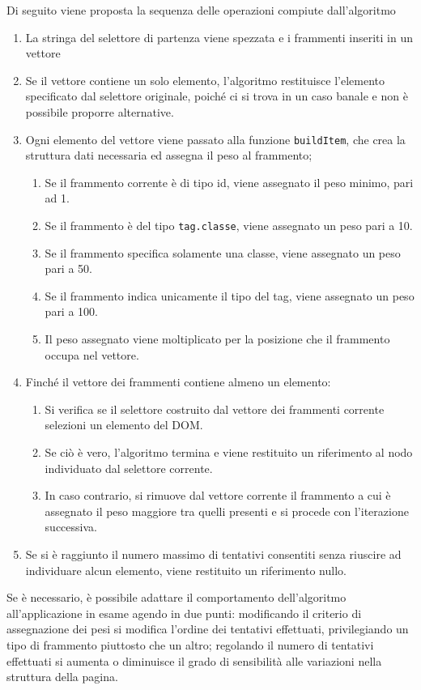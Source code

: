 Di seguito viene proposta la sequenza delle operazioni compiute dall'algoritmo

\begin{enumerate}
\item La stringa del selettore di partenza viene spezzata e i frammenti inseriti in un vettore
\item Se il vettore contiene un solo elemento, l'algoritmo restituisce l'elemento specificato dal selettore originale, poiché ci si trova in un caso banale e non è possibile proporre alternative.
\item Ogni elemento del vettore viene passato alla funzione \verb|buildItem|, che crea la struttura dati necessaria ed assegna il peso al frammento;
	\begin{enumerate}
		\item Se il frammento corrente è di tipo id, viene assegnato il peso minimo, pari ad 1.
		\item Se il frammento è del tipo \verb|tag.classe|, viene assegnato un peso pari a 10.
		\item Se il frammento specifica solamente una classe, viene assegnato un peso pari a 50.
		\item Se il frammento indica unicamente il tipo del tag, viene assegnato un peso pari a 100.
		\item Il peso assegnato viene moltiplicato per la posizione che il frammento occupa nel vettore.
	\end{enumerate}
\item Finché il vettore dei frammenti contiene almeno un elemento:
	\begin{enumerate}
		\item Si verifica se il selettore costruito dal vettore dei frammenti corrente selezioni un elemento del DOM.
		\item Se ciò è vero, l'algoritmo termina e viene restituito un riferimento al nodo individuato dal selettore corrente.
		\item In caso contrario, si rimuove dal vettore corrente il frammento a cui è assegnato il peso maggiore tra quelli presenti e si procede con l'iterazione successiva.
	\end{enumerate}	
\item Se si è raggiunto il numero massimo di tentativi consentiti senza riuscire ad individuare alcun elemento, viene restituito un riferimento nullo.
\end{enumerate}

Se è necessario, è possibile adattare il comportamento dell'algoritmo all'applicazione in esame agendo in due punti: modificando il criterio di assegnazione dei pesi si modifica l'ordine dei tentativi effettuati, privilegiando un tipo di frammento piuttosto che un altro; regolando il numero di tentativi effettuati si aumenta o diminuisce il grado di sensibilità alle variazioni nella struttura della pagina.